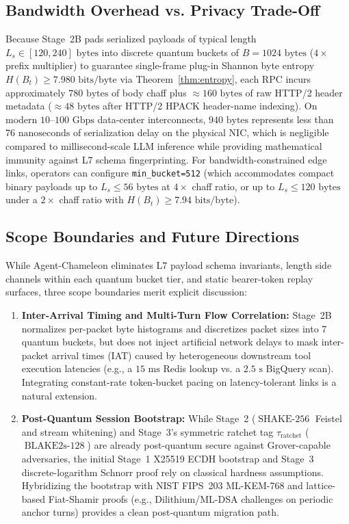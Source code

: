\documentclass[conference,10pt]{IEEEtran}
\begin{document}
\subsection{Bandwidth Overhead vs. Privacy Trade-Off}
Because Stage~2B pads serialized payloads of typical length $L_s \in [120, 240]\text{ bytes}$ into discrete quantum buckets of $B = 1024\text{ bytes}$ ($4\times$ prefix multiplier) to guarantee single-frame plug-in Shannon byte entropy $H(B_t) \ge 7.980\text{ bits/byte}$ via Theorem~\ref{thm:entropy}, each RPC incurs approximately $780\text{ bytes}$ of body chaff plus $\approx 160\text{ bytes}$ of raw HTTP/2 header metadata ($\approx 48\text{ bytes}$ after HTTP/2 HPACK header-name indexing). On modern $10$--$100\text{ Gbps}$ data-center interconnects, $940\text{ bytes}$ represents less than $76\text{ nanoseconds}$ of serialization delay on the physical NIC, which is negligible compared to millisecond-scale LLM inference while providing mathematical immunity against L7 schema fingerprinting. For bandwidth-constrained edge links, operators can configure \texttt{min\_bucket=512} (which accommodates compact binary payloads up to $L_s \le 56\text{ bytes}$ at $4\times$ chaff ratio, or up to $L_s \le 120\text{ bytes}$ under a $2\times$ chaff ratio with $H(B_t) \ge 7.94\text{ bits/byte}$).

\subsection{Scope Boundaries and Future Directions}
While Agent-Chameleon eliminates L7 payload schema invariants, length side channels within each quantum bucket tier, and static bearer-token replay surfaces, three scope boundaries merit explicit discussion:
\begin{enumerate}
    \item \textbf{Inter-Arrival Timing and Multi-Turn Flow Correlation:} Stage~2B normalizes per-packet byte histograms and discretizes packet sizes into 7 quantum buckets, but does not inject artificial network delays to mask inter-packet arrival times (IAT) caused by heterogeneous downstream tool execution latencies (e.g., a $15\text{ ms}$ Redis lookup vs. a $2.5\text{ s}$ BigQuery scan). Integrating constant-rate token-bucket pacing on latency-tolerant links is a natural extension.
    \item \textbf{Post-Quantum Session Bootstrap:} While Stage~2 ($\operatorname{SHAKE-256}$ Feistel and stream whitening) and Stage~3's symmetric ratchet tag $\tau_{\text{ratchet}}$ ($\operatorname{BLAKE2s-128}$) are already post-quantum secure against Grover-capable adversaries, the initial Stage~1 X25519 ECDH bootstrap and Stage~3 discrete-logarithm Schnorr proof rely on classical hardness assumptions. Hybridizing the bootstrap with NIST FIPS~203 ML-KEM-768 and lattice-based Fiat-Shamir proofs (e.g., Dilithium/ML-DSA challenges on periodic anchor turns) provides a clean post-quantum migration path.
\end{enumerate}
\end{document}
